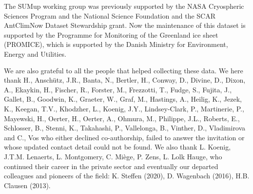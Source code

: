 \documentclass[journal abbreviation, manuscript]{copernicus}
\begin{document}
The SUMup working group was previously supported by the NASA Cryospheric Sciences Program and the National Science Foundation and the SCAR AntClimNow Dataset Stewardship grant. Now the maintenance of this dataset is supported by the Programme for Monitoring of the Greenland ice sheet (PROMICE), which is supported by the Danish Ministry for Environment, Energy and Utilities.

\bigskip

We are also grateful to all the people that helped collecting these data. We here thank H., Anschütz, J.R., Banta, N., Bertler, H., Conway, D., Divine, D., Dixon, A., Ekaykin, H., Fischer, R., Forster, M., Frezzotti, T., Fudge, S., Fujita, J., Gallet, B., Goodwin, K., Graeter, W., Graf, M., Hastings, A., Heilig, K., Jezek, K., Keegan, T.V., Khodzher, L., Koenig, J.Y., Lindsey-Clark, P., Martinerie, P., Mayewski, H., Oerter, H., Oerter, A., Ohmura, M., Philippe, J.L., Roberts, E., Schlosser, B., Stenni, K., Takahashi, P., Vallelonga, B., Vinther, D., Vladimirova and C., Vos who either declined co-authorship, failed to answer the invitation or whose updated contact detail could not be found. We also thank L. Koenig, J.T.M. Lenaerts, L. Montgomery, C. Miège, P. Zens, L. Lolk Hauge, who continued their career in the private sector and eventually our departed colleagues and pioneers of the field: K. Steffen (2020), D. Wagenbach (2016), H.B. Clausen (2013).

\bigskip
\end{document}

